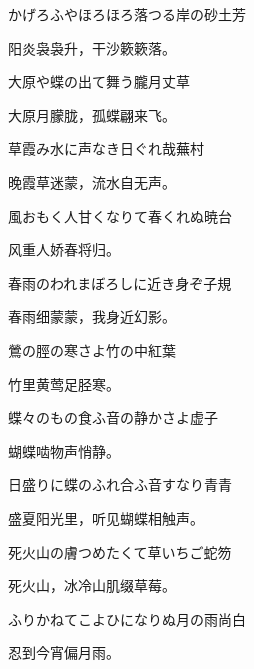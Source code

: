 \begin{haiku}
    {\FH かげろふやほろほろ落つる岸の砂}\hfill{\FH 土芳}

    {\FK 阳炎袅袅升，干沙簌簌落。}
\end{haiku}

\begin{haiku}
    {\FH 大原や蝶の出て舞う朧月}\hfill{\FH 丈草}

    {\FK 大原月朦胧，孤蝶翩来飞。}
\end{haiku}

\begin{haiku}
    {\FH 草霞み水に声なき日ぐれ哉}\hfill{\FH 蕪村}

    {\FK 晚霞草迷蒙，流水自无声。}
\end{haiku}

\begin{haiku}
    {\FH 風おもく人甘くなりて春くれぬ}\hfill{\FH 暁台}

    {\FK 风重人娇春将归。}
\end{haiku}

\begin{haiku}
    {\FH 春雨のわれまぼろしに近き身ぞ}\hfill{\FH 子規}

    {\FK 春雨细蒙蒙，我身近幻影。}
\end{haiku}

\begin{haiku}
    {\FH 鶯の脛の寒さよ竹の中}\hfill{\FH 紅葉}

    {\FK 竹里黄莺足胫寒。}
\end{haiku}

\begin{haiku}
    {\FH 蝶々のもの食ふ音の静かさよ}\hfill{\FH 虚子}

    {\FK 蝴蝶啮物声悄静。}
\end{haiku}

\begin{haiku}
    {\FH 日盛りに蝶のふれ合ふ音すなり}\hfill{\FH 青青}

    {\FK 盛夏阳光里，听见蝴蝶相触声。}
\end{haiku}

\begin{haiku}
    {\FH 死火山の膚つめたくて草いちご}\hfill{\FH 蛇笏}

    {\FK 死火山，冰冷山肌缀草莓。}
\end{haiku}

\begin{haiku}
    {\FH ふりかねてこよひになりぬ月の雨}\hfill{\FH 尚白}

    {\FK 忍到今宵偏月雨。}
\end{haiku}

